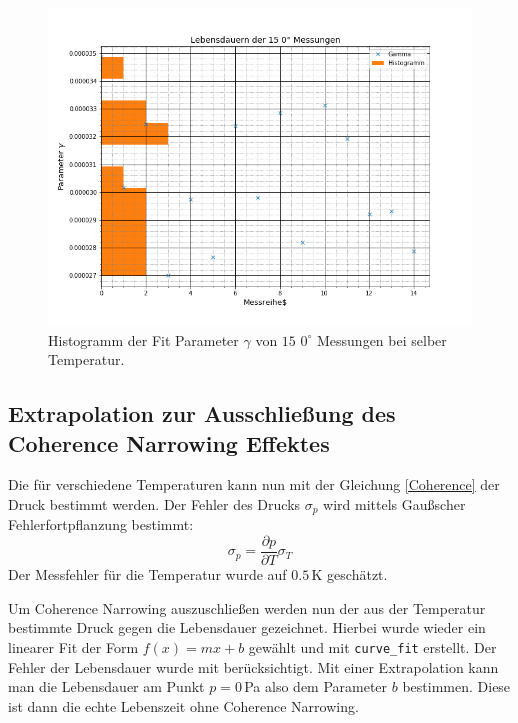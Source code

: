 \begin{figure}[ht]
\includegraphics[scale=0.5]{Bild/gammas_hist}
\centering
\caption[Histogramm zur Bestimmung der Fehler]{Histogramm der Fit Parameter $\gamma$ von $15$ $0^\circ$ Messungen bei selber Temperatur.}
\label{Fail}
\end{figure}
\subsection{Extrapolation zur Ausschließung des Coherence Narrowing Effektes}
Die für verschiedene Temperaturen kann nun mit der Gleichung \ref{Coherence} der Druck bestimmt werden. Der Fehler des Drucks $\sigma_p$ wird mittels Gaußscher Fehlerfortpflanzung bestimmt:
\begin{equation}
\sigma_p = \frac{\partial p}{\partial T} \sigma_T
\end{equation}
Der Messfehler für die Temperatur wurde auf $0.5\,$K geschätzt.\par
Um Coherence Narrowing auszuschließen werden nun der aus der Temperatur bestimmte Druck gegen die Lebensdauer gezeichnet. Hierbei wurde wieder ein linearer Fit der Form $f(x)=mx+b$ gewählt und mit \verb|curve_fit| erstellt. Der Fehler der Lebensdauer wurde mit berücksichtigt. Mit einer Extrapolation kann man die Lebensdauer am Punkt $p=0\,$Pa also dem Parameter $b$ bestimmen. Diese ist dann die echte Lebenszeit ohne Coherence Narrowing. 
